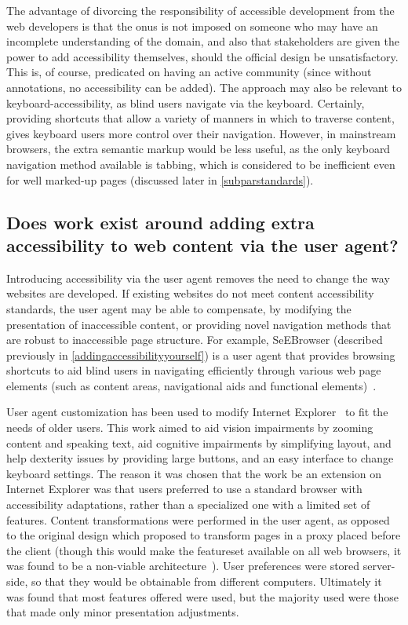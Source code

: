 \documentclass[a4paper, 12pt]{report}
\begin{document}
The advantage of divorcing the responsibility of accessible development from the web developers is that the onus is not imposed on someone who may have an incomplete understanding of the domain, and also that stakeholders are given the power to add accessibility themselves, should the official design be unsatisfactory. This is, of course, predicated on having an active community (since without annotations, no accessibility can be added). The approach may also be relevant to keyboard-accessibility, as blind users navigate via the keyboard. Certainly, providing shortcuts that allow a variety of manners in which to traverse content, gives keyboard users more control over their navigation. However, in mainstream browsers, the extra semantic markup would be less useful, as the only keyboard navigation method available is tabbing, which is considered to be inefficient even for well marked-up pages (discussed later in \cref{subparstandards}).
\subsection{Does work exist around adding extra accessibility to web content via the user agent?}
Introducing accessibility via the user agent removes the need to change the way websites are developed. If existing websites do not meet content accessibility standards, the user agent may be able to compensate, by modifying the presentation of inaccessible content, or providing novel navigation methods that are robust to inaccessible page structure. For example, SeEBrowser (described previously in \cref{addingaccessibilityyourself}) is a user agent that provides browsing shortcuts to aid blind users in navigating efficiently through various web page elements (such as content areas, navigational aids and functional elements)~\cite{kouroupetroglou2007browsing}.

User agent customization has been used to modify Internet Explorer~\cite{hanson2005personalization} to fit the needs of older users. This work aimed to aid vision impairments by zooming content and speaking text, aid cognitive impairments by simplifying layout, and help dexterity issues by providing large buttons, and an easy interface to change keyboard settings. The reason it was chosen that the work be an extension on Internet Explorer was that users preferred to use a standard browser with accessibility adaptations, rather than a specialized one with a limited set of features. Content transformations were performed in the user agent, as opposed to the original design which proposed to transform pages in a proxy placed before the client (though this would make the featureset available on all web browsers, it was found to be a non-viable architecture~\cite{fairweather2002distributed,czaja2002designing,hanson2005achieving}). User preferences were stored server-side, so that they would be obtainable from different computers. Ultimately it was found that most features offered were used, but the majority used were those that made only minor presentation adjustments.
\end{document}
